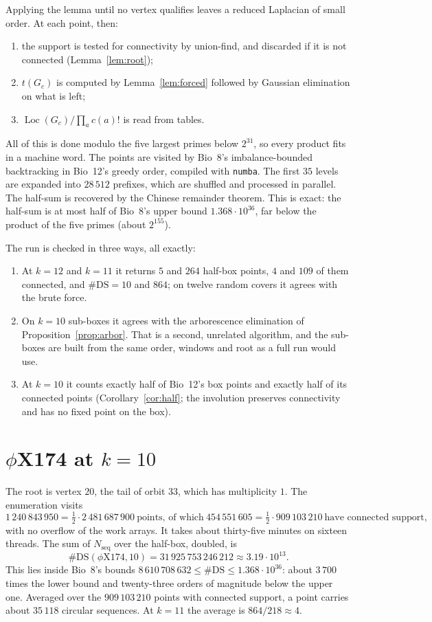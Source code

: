 \documentclass[11pt]{article}
\theoremstyle{plain}
\theoremstyle{definition}
\theoremstyle{remark}
\newcommand{\Loc}{\operatorname{Loc}}
\newcommand{\Nseq}{N_{\mathrm{seq}}}
\newcommand{\DS}{\mathrm{DS}}
\begin{document}
Applying the lemma until no vertex qualifies leaves a reduced Laplacian of small order. At each
point, then:
\begin{enumerate}
\item the support is tested for connectivity by union-find, and discarded if it is not
connected (Lemma~\ref{lem:root});
\item $t(G_c)$ is computed by Lemma~\ref{lem:forced} followed by Gaussian elimination on
what is left;
\item $\Loc(G_c)/\prod_a c(a)!$ is read from tables.
\end{enumerate}
All of this is done modulo the five largest primes below $2^{31}$, so every product fits in a
machine word. The points are visited by Bio~8's imbalance-bounded backtracking in Bio~12's
greedy order, compiled with \texttt{numba}. The first $35$ levels are expanded into $28\,512$
prefixes, which are shuffled and processed in parallel. The half-sum is recovered by the
Chinese remainder theorem. This is exact: the half-sum is at most half of Bio~8's upper bound
$1.368\cdot10^{36}$, far below the product of the five primes (about $2^{155}$).

The run is checked in three ways, all exactly:
\begin{enumerate}
\item At $k=12$ and $k=11$ it returns $5$ and $264$ half-box points, $4$ and $109$ of them
connected, and $\#\DS=10$ and $864$; on twelve random covers it agrees with the brute force.
\item On $k=10$ sub-boxes it agrees with the arborescence elimination of
Proposition~\ref{prop:arbor}. That is a second, unrelated algorithm, and the sub-boxes are
built from the same order, windows and root as a full run would use.
\item At $k=10$ it counts exactly half of Bio~12's box points and exactly half of its
connected points (Corollary~\ref{cor:half}; the involution preserves connectivity and has no
fixed point on the box).
\end{enumerate}

\section{$\phi$X174 at $k=10$}\label{sec:result}

The root is vertex $20$, the tail of orbit $33$, which has multiplicity $1$. The enumeration
visits
\[
1\,240\,843\,950=\tfrac12\cdot 2\,481\,687\,900 \ \text{points, of which}\
454\,551\,605=\tfrac12\cdot 909\,103\,210\ \text{have connected support},
\]
with no overflow of the work arrays. It takes about thirty-five minutes on sixteen threads.
The sum of $\Nseq$ over the half-box, doubled, is
\[
\boxed{\;\#\DS(\phi\mathrm{X}174,10)=31\,925\,753\,246\,212\approx3.19\cdot10^{13}.\;}
\]
This lies inside Bio~8's bounds $8\,610\,708\,632\le\#\DS\le1.368\cdot10^{36}$: about $3\,700$
times the lower bound and twenty-three orders of magnitude below the upper one. Averaged over
the $909\,103\,210$ points with connected support, a point carries about $35\,118$ circular
sequences. At $k=11$ the average is $864/218\approx4$.
\end{document}
